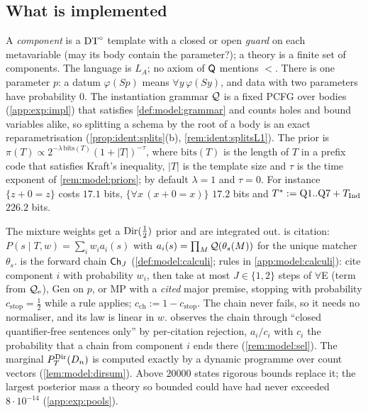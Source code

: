 \subsection{What is implemented}\label{sec:exp:impl}

A \emph{component} is a $\mathrm{DT}^{\circ}$ template with a closed or open \emph{guard} on each metavariable (may its body contain the parameter?); a theory is a finite set of components. The language is $L_A$; no axiom of $\mathsf{Q}$ mentions $<$. There is one parameter $p$: a datum $\varphi(Sp)$ means $\forall y\,\varphi(Sy)$, and data with two parameters have probability $0$. The instantiation grammar $\mathcal{Q}$ is a fixed PCFG over bodies (\cref{app:exp:impl}) that satisfies \cref{def:model:grammar} and counts holes and bound variables alike, so splitting a schema by the root of a body is an exact reparametrisation (\cref{prop:ident:splits}(b), \cref{rem:ident:splitsL1}). The prior is $\pi(T)\propto2^{-\lambda\,\mathrm{bits}(T)}(1+|T|)^{-\tau}$, where $\mathrm{bits}(T)$ is the length of $T$ in a prefix code that satisfies Kraft's inequality, $|T|$ is the template size and $\tau$ is the time exponent of \cref{rem:model:priors}; by default $\lambda=1$ and $\tau=0$. For instance $\{z+0=z\}$ costs $17.1$ bits, $\{\forall x\,(x+0=x)\}$ $17.2$ bits and $T^*:=\mathrm{Q1..Q7}+T_{\mathrm{Ind}}$ $226.2$ bits.

The mixture weights get a $\mathrm{Dir}(\tfrac12)$ prior and are integrated out. \Lzero{} is citation: $P(s\mid T,w)=\sum_iw_ia_i(s)$ with $a_i(s)=\prod_M\mathcal{Q}(\theta_s(M))$ for the unique matcher $\theta_s$. \Lone{} is the forward chain $\mathsf{Ch}_{J}$ (\cref{def:model:calculi}; rules in \cref{app:model:calculi}): cite component $i$ with probability $w_i$, then take at most $J\in\{1,2\}$ steps of $\forall$E (term from $\mathcal{Q}_{\mathrm{e}}$), Gen on $p$, or MP with a \emph{cited} major premise, stopping with probability $c_{\mathrm{stop}}=\tfrac12$ while a rule applies; $c_{\mathrm{ch}}:=1-c_{\mathrm{stop}}$. The chain never fails, so it needs no normaliser, and its law is linear in $w$. \Lselc{} observes the chain through ``closed quantifier-free sentences only'' by per-citation rejection, $a_i/c_i$ with $c_i$ the probability that a chain from component $i$ ends there (\cref{rem:model:sel}). The marginal $P^{\mathrm{Dir}}_{T}(D_n)$ is computed exactly by a dynamic programme over count vectors (\cref{lem:model:dirsum}). Above $20000$ states rigorous bounds replace it; the largest posterior mass a theory so bounded could have had never exceeded $8\cdot10^{-14}$ (\cref{app:exp:pools}).


